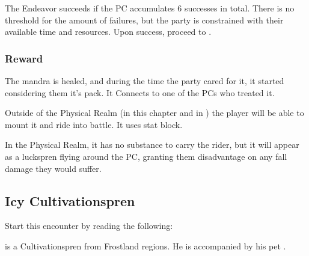 The Endeavor succeeds if the PC accumulates 6 successes in total. There is no threshold for the amount of failures, but the party is constrained with their available time and resources. Upon success, proceed to .

\subsubsection{Reward}
\label{ssec:celebrantLucksprenReward}

The mandra is healed, and during the time the party cared for it, it started considering them it's pack. It Connects to one of the PCs who treated it.

Outside of the Physical Realm (in this chapter and in ) the player will be able to mount it and ride into battle. It uses \enemyLuckspren{} stat block.

In the Physical Realm, it has no substance to carry the rider, but it will appear as a luckspren flying around the PC, granting them disadvantage on any fall damage they would suffer.






\subsection{Icy Cultivationspren}
\label{ssec:celebrantIceCultivationspren}

Start this encounter by reading the following:


\npcIceCultivationsprenTrader{} is a \enemyTrueSpren{} Cultivationspren from Frostland regions. He is accompanied by his pet \enemyFrostSpren{}.

